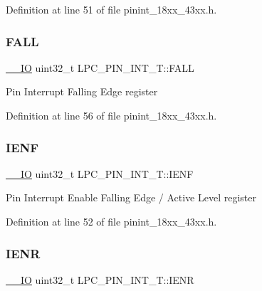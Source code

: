 Definition at line 51 of file pinint\+\_\+18xx\+\_\+43xx.\+h.

\mbox{\label{struct_l_p_c___p_i_n___i_n_t___t_a0a636a94b44042ec47f27ddcc1ac6584}} 
\subsubsection{\texorpdfstring{F\+A\+LL}{FALL}}
{\footnotesize\ttfamily \hyperlink{core__sc300_8h_aec43007d9998a0a0e01faede4133d6be}{\+\_\+\+\_\+\+IO} uint32\+\_\+t L\+P\+C\+\_\+\+P\+I\+N\+\_\+\+I\+N\+T\+\_\+\+T\+::\+F\+A\+LL}

Pin Interrupt Falling Edge register 

Definition at line 56 of file pinint\+\_\+18xx\+\_\+43xx.\+h.

\mbox{\label{struct_l_p_c___p_i_n___i_n_t___t_a08455782419bcc978d6431c2ac14344c}} 
\subsubsection{\texorpdfstring{I\+E\+NF}{IENF}}
{\footnotesize\ttfamily \hyperlink{core__sc300_8h_aec43007d9998a0a0e01faede4133d6be}{\+\_\+\+\_\+\+IO} uint32\+\_\+t L\+P\+C\+\_\+\+P\+I\+N\+\_\+\+I\+N\+T\+\_\+\+T\+::\+I\+E\+NF}

Pin Interrupt Enable Falling Edge / Active Level register 

Definition at line 52 of file pinint\+\_\+18xx\+\_\+43xx.\+h.

\mbox{\label{struct_l_p_c___p_i_n___i_n_t___t_a7e61100f418f7e52168858d5f73a9c2c}} 
\subsubsection{\texorpdfstring{I\+E\+NR}{IENR}}
{\footnotesize\ttfamily \hyperlink{core__sc300_8h_aec43007d9998a0a0e01faede4133d6be}{\+\_\+\+\_\+\+IO} uint32\+\_\+t L\+P\+C\+\_\+\+P\+I\+N\+\_\+\+I\+N\+T\+\_\+\+T\+::\+I\+E\+NR}

